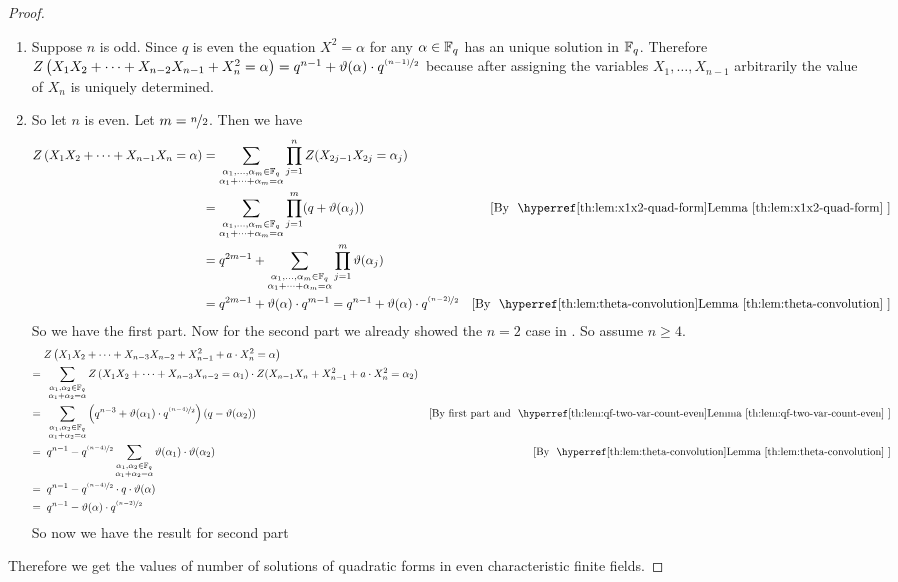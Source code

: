 \begin{proof}
  \begin{enumerate}[label=(\roman*)]
    \item Suppose $n$ is odd. Since $q$ is even the equation $X^2=\alpha$ for any $\alpha\in\mathbb{F}_q$ has an unique solution in $\mathbb{F}_q$. Therefore $Z\left(X_1X_2+\cdots + X_{n-2}X_{n-1}+X_n^2=\alpha\right)=q^{n-1}+\vartheta(\alpha)\cdot q^{\nicefrac{(n-1)}{2}}$ because after assigning the variables $X_1,\dots, X_{n-1}$ arbitrarily the value of $X_n$ is uniquely determined. 
    \item So let $n$ is even. Let $m=\nicefrac{n}2$. Then we have \begin{align*}
        Z\lt(X_1X_2+\cdots +X_{n-1}X_n=\alpha\rt)& = \sum_{\substack{\alpha_1,\dots,\alpha_m\in\bbF_q\\ \alpha_1+\cdots+\alpha_m=\alpha}}\prod_{j=1}^n Z(X_{2j-1}X_{2j}=\alpha_j)\\ 
        & = \sum_{\substack{\alpha_1,\dots,\alpha_m\in\bbF_q\\ \alpha_1+\cdots+\alpha_m=\alpha}} \prod_{j=1}^m (q+\vth(\alpha_j)) \byl{x1x2-quad-form}\\ 
        & = q^{2m-1}+\sum_{\substack{\alpha_1,\dots,\alpha_m\in\bbF_q\\ \alpha_1+\cdots+\alpha_m=\alpha}}\prod_{j=1}^m\vth(\alpha_j)\\ 
        & = q^{2m-1}+\vth(\alpha)\cdot q^{m-1}=q^{n-1}+\vth(\alpha)\cdot q^{\nicefrac{(n-2)}{2}}\by{\QFConvProplem}
      \end{align*}
      So we have the first part. Now for the second part we already showed the $n=2$ case in \QFTwoVarEvenlem. So assume $n\geq 4$.  
      \begin{align*}
        & Z\lt(X_1X_2+\cdots+X_{n-3}X_{n-2}+X_{n-1}^2+a\cdot X_n^2=\alpha\rt)\\ 
        = \;&\;\sum_{\substack{\alpha_1,\alpha_2\in\bbF_q\\ \alpha_1+\alpha_2=\alpha}}Z\lt(X_1X_2+\cdots+X_{n-3}X_{n-2}=\alpha_1\rt)\cdot Z(X_{n-1}X_{n}+X_{n-1}^2+a\cdot X_n^2=\alpha_2)\\ 
        = \;&\; \sum_{\substack{\alpha_1,\alpha_2\in\bbF_q\\ \alpha_1+\alpha_2=\alpha}} \lt(q^{n-3}+\vth(\alpha_1)\cdot q^{\nicefrac{(n-4)}{2}}\rt)(q-\vth(\alpha_2))\by{first part and \QFTwoVarEvenlem}\\ 
        = \;&\; q^{n-1}-q^{\nicefrac{(n-4)}{2}}\sum_{\substack{\alpha_1,\alpha_2\in\bbF_q\\ \alpha_1+\alpha_2=\alpha}}\vth(\alpha_1)\cdot\vth(\alpha_2) \by{\QFConvProplem}\\ 
        = \;&\; q^{n-1}-q^{\nicefrac{(n-4)}{2}}\cdot q\cdot \vth(\alpha)\\ 
        = \;&\; q^{n-1}-\vth(\alpha)\cdot q^{\nicefrac{(n-2)}{2}}
      \end{align*}
      So now we have the result for second part
  \end{enumerate}
  Therefore we get the values of number of solutions of quadratic forms in even characteristic finite fields. 
\end{proof}